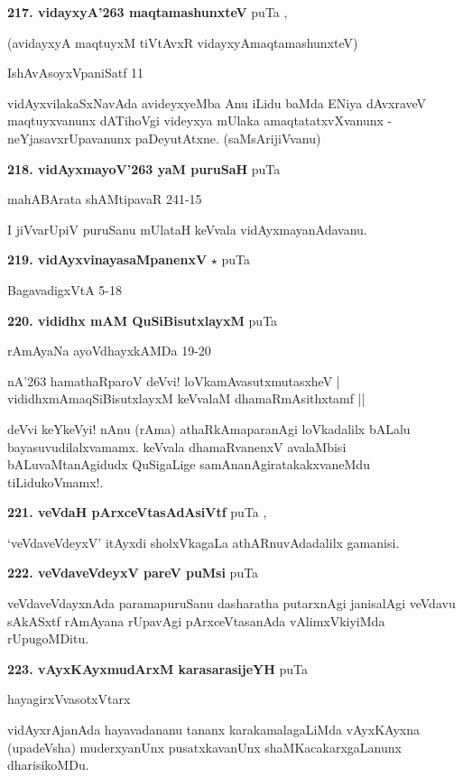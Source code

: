 \medskip
\noindent\textbf{217. vidayxyA\char'263 maqtamashunxteV} \hfill puTa \pageref{99},\pageref{133a}

(avidayxyA maqtuyxM tiVtAvxR vidayxyAmaqtamashunxteV)

\hfill IshAvAsoyxVpaniSatf 11

vidAyxvilakaSxNavAda avideyxyeMba Anu iLidu baMda ENiya dAvxraveV maqtuyxvanunx dATihoVgi videyxya mUlaka amaqtatatxvXvanunx - neYjasavxrUpavanunx paDeyutAtxne. (saMsArijiVvanu)

\medskip
\noindent\textbf{218. vidAyxmayoV\char'263 yaM puruSaH} \hfill puTa \pageref{133b}

\hfill mahABArata shAMtipavaR 241-15

I jiVvarUpiV puruSanu mUlataH keVvala vidAyxmayanAdavanu.

\medskip
\noindent\textbf{219. vidAyxvinayasaMpanenxV} $\star$ \hfill puTa \pageref{67}

\hfill BagavadigxVtA 5-18

\medskip
\noindent\textbf{220. vididhx mAM QuSiBisutxlayxM} \hfill puTa \pageref{151b}

\hfill rAmAyaNa ayoVdhayxkAMDa 19-20

\begin{shloka}
nA\char'263 hamathaRparoV deVvi! loVkamAvasutxmutasxheV |\\
vididhxmAmaqSiBisutxlayxM keVvalaM dhamaRmAsithxtamf ||
\end{shloka}

deVvi keYkeVyi! nAnu (rAma) athaRkAmaparanAgi loVkadalilx bALalu bayasuvudilalxvamamx. keVvala dhamaRvanenxV avalaMbisi bALuvaMtanAgidudx QuSigaLige samAnanAgiratakakxvaneMdu tiLidukoVmamx!.

\medskip
\noindent\textbf{221. veVdaH pArxceVtasAdAsiVtf} \hfill puTa \pageref{228},\pageref{232c}

`veVdaveVdeyxV' itAyxdi sholxVkagaLa athARnuvAdadalilx gamanisi.

\medskip
\noindent\textbf{222. veVdaveVdeyxV pareV puMsi} \hfill puTa \pageref{168c}

veVdaveVdayxnAda paramapuruSanu dasharatha putarxnAgi janisalAgi veVdavu sAkASxtf rAmAyana rUpavAgi pArxceVtasanAda vAlimxVkiyiMda rUpugoMDitu.

\medskip
\noindent\textbf{223. vAyxKAyxmudArxM karasarasijeYH} \hfill puTa \pageref{100}

\hfill hayagirxVvasotxVtarx

vidAyxrAjanAda hayavadananu tananx karakamalagaLiMda vAyxKAyxna (upadeVsha) muderxyanUnx pusatxkavanUnx shaMKacakarxgaLanunx dharisikoMDu.
 
